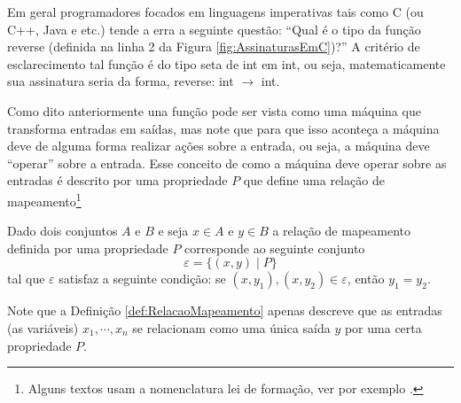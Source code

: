 \begin{note}\label{note:TipoFuncao}
	Em geral programadores focados em linguagens imperativas tais como C (ou C++, Java e etc.) tende a erra a seguinte questão: ``Qual é o tipo da função reverse (definida na linha 2 da Figura \ref{fig:AssinaturasEmC})?'' A critério de esclarecimento tal função é do tipo seta de int em int, ou seja, matematicamente sua assinatura seria da forma, reverse: int $\rightarrow$ int.
\end{note}

Como dito anteriormente una função pode ser vista como uma máquina que transforma entradas em saídas, mas note que para que isso aconteça a máquina deve de alguma forma realizar ações sobre a entrada, ou seja, a máquina deve ``operar'' sobre a entrada. Esse conceito de como a máquina deve operar sobre as entradas é descrito por uma propriedade $P$ que define uma relação de mapeamento\footnote{Alguns textos usam a nomenclatura lei de formação, ver por exemplo \cite{carmo2013}.}

\begin{definition}\label{def:RelacaoMapeamento}
	Dado dois conjuntos $A$ e $B$ e seja $x \in A$ e $y \in B$ a relação de mapeamento definida por uma propriedade $P$ corresponde  ao seguinte conjunto 
	$$\varepsilon = \{(x, y)\mid P\}$$ tal que $\varepsilon$ satisfaz a seguinte condição: se $(x, y_1), (x, y_2) \in \varepsilon$, então $y_1 = y_2$.
\end{definition}

Note que a Definição \ref{def:RelacaoMapeamento} apenas descreve que as entradas (as variáveis) $x_1, \cdots, x_n$ se relacionam como uma única saída $y$ por uma certa propriedade $P$.

